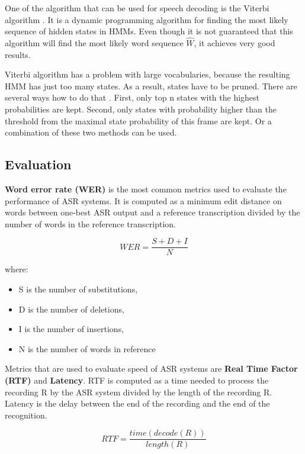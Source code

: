 One of the algorithm that can be used for speech decoding is the Viterbi algorithm \cite{forney1973viterbi}.
It is a dynamic programming algorithm for finding the most likely sequence of hidden states in HMMs.
Even though it is not guaranteed that this algorithm will find the most likely word sequence $\widehat{W}$,
  it achieves very good results.

Viterbi algorithm has a problem with large vocabularies,
  because the resulting HMM has just too many states.
As a result, states have to be pruned.
There are several ways how to do that \cite{jang2002optimization}.
First, only top n states with the highest probabilities are kept.
Second, only states with probability higher than the threshold from the maximal state probability of this frame are kept.
Or a combination of these two methods can be used.


\subsection{Evaluation}
\textbf{Word error rate (WER)} is the most common metrics used to evaluate the performance of ASR systems.
It is computed as a minimum edit distance on words between one-best ASR output and a reference transcription divided by the number of words in the reference transcription.

\begin{equation}
  WER = \frac{S + D + I}{N}
\end{equation}

where:
\begin{itemize}
  \item S is the number of substitutions,
  \item D is the number of deletions,
  \item I is the number of insertions,
  \item N is the number of words in reference
\end{itemize}

Metrics that are used to evaluate speed of ASR systems are \textbf{Real Time Factor (RTF)} and \textbf{Latency}.
RTF is computed as a time needed to process the recording R by the ASR system divided by the length of the recording R.
Latency is the delay between the end of the recording and the end of the recognition.

\begin{equation}
  RTF = \frac{time(decode(R))}{length(R)}
\end{equation}


